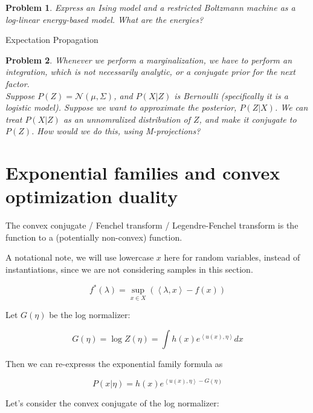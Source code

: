 \documentclass[a4paper]{article}
\newtheorem{problem}{Problem}[section]
\begin{document}
\begin{problem}
  Express an Ising model and a restricted Boltzmann machine as a log-linear energy-based model.  What are the energies?  
\end{problem}

Expectation Propagation
\begin{problem}
  Whenever we perform a marginalization, we have to perform an integration, which is not necessarily analytic, or a conjugate prior for the next factor. \\
  Suppose $P(Z) = \mathcal{N}(\mu,\Sigma)$, and $P(X \vert Z)$ is Bernoulli (specifically it is a logistic model).  Suppose we want to approximate the posterior, $P(Z \vert X)$.  We can treat $P(X \vert Z)$ as an unnomralized distribution of $Z$, and make it conjugate to $P(Z)$.  How would we do this, using M-projections?  \\
\end{problem}

\section{Exponential families and convex optimization duality}

The convex conjugate / Fenchel transform / Legendre-Fenchel transform is the function to a (potentially non-convex) function.

A notational note, we will use lowercase $x$ here for random variables, instead of instantiations, since we are not considering samples in this section.

\begin{equation}
  f^*( \lambda ) = \sup_{x \in X} \left( \left< \lambda, x \right> - f(x) \right)
  \label{convex conjugate}
\end{equation}

Let $G(\eta)$ be the log normalizer:

\begin{equation}
  G(\eta) = \log Z(\eta) = \int h(x) e^{ \left< u(x), \eta \right> } dx
  \label{}
\end{equation}

Then we can re-expresss the exponential family formula as

\begin{equation}
  P( x \vert \eta) = h(x) e^{ \left< u(x), \eta \right> - G(\eta) }
  \label{}
\end{equation}

Let's consider the convex conjugate of the log normalizer:
\end{document}
